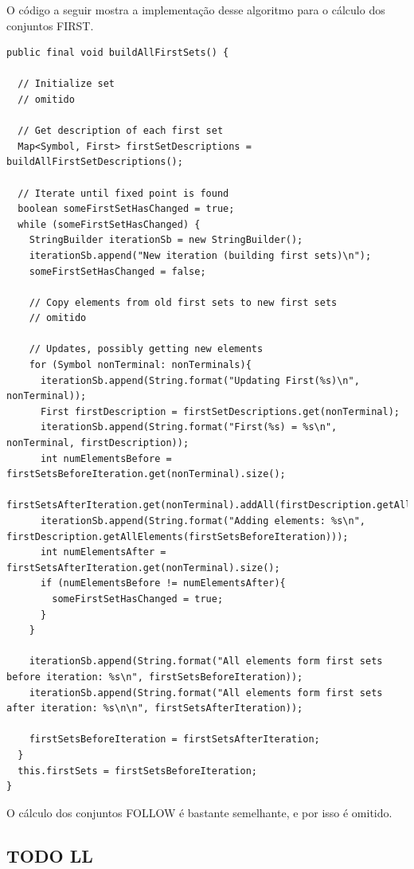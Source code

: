 \documentclass[11pt]{article}
\begin{document}
O código a seguir mostra a implementação desse algoritmo para o cálculo dos
conjuntos FIRST.

\begin{verbatim}
public final void buildAllFirstSets() {

  // Initialize set
  // omitido

  // Get description of each first set
  Map<Symbol, First> firstSetDescriptions = buildAllFirstSetDescriptions();

  // Iterate until fixed point is found
  boolean someFirstSetHasChanged = true;
  while (someFirstSetHasChanged) {
    StringBuilder iterationSb = new StringBuilder();
    iterationSb.append("New iteration (building first sets)\n");
    someFirstSetHasChanged = false;

    // Copy elements from old first sets to new first sets
    // omitido

    // Updates, possibly getting new elements
    for (Symbol nonTerminal: nonTerminals){
      iterationSb.append(String.format("Updating First(%s)\n", nonTerminal));
      First firstDescription = firstSetDescriptions.get(nonTerminal);
      iterationSb.append(String.format("First(%s) = %s\n", nonTerminal, firstDescription));
      int numElementsBefore = firstSetsBeforeIteration.get(nonTerminal).size();
      firstSetsAfterIteration.get(nonTerminal).addAll(firstDescription.getAllElements(firstSetsBeforeIteration));
      iterationSb.append(String.format("Adding elements: %s\n", firstDescription.getAllElements(firstSetsBeforeIteration)));
      int numElementsAfter = firstSetsAfterIteration.get(nonTerminal).size();
      if (numElementsBefore != numElementsAfter){
        someFirstSetHasChanged = true;
      }
    }

    iterationSb.append(String.format("All elements form first sets before iteration: %s\n", firstSetsBeforeIteration));
    iterationSb.append(String.format("All elements form first sets after iteration: %s\n\n", firstSetsAfterIteration));

    firstSetsBeforeIteration = firstSetsAfterIteration;
  }
  this.firstSets = firstSetsBeforeIteration;
}
\end{verbatim}

O cálculo dos conjuntos FOLLOW é bastante semelhante, e por isso é omitido.

\subsection{{\bfseries\sffamily TODO} LL}
\label{sec:orgheadline7}
\end{document}
